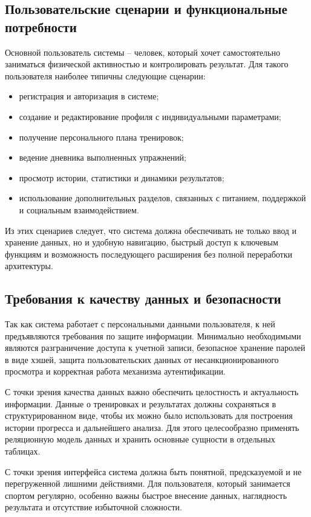 \subsection{Пользовательские сценарии и функциональные потребности}

Основной пользователь системы -- человек, который хочет самостоятельно заниматься физической активностью и контролировать результат. Для такого пользователя наиболее типичны следующие сценарии:
\begin{itemize}
	\item регистрация и авторизация в системе;
	\item создание и редактирование профиля с индивидуальными параметрами;
	\item получение персонального плана тренировок;
	\item ведение дневника выполненных упражнений;
	\item просмотр истории, статистики и динамики результатов;
	\item использование дополнительных разделов, связанных с питанием, поддержкой и социальным взаимодействием.
\end{itemize}

Из этих сценариев следует, что система должна обеспечивать не только ввод и хранение данных, но и удобную навигацию, быстрый доступ к ключевым функциям и возможность последующего расширения без полной переработки архитектуры.

\subsection{Требования к качеству данных и безопасности}

Так как система работает с персональными данными пользователя, к ней предъявляются требования по защите информации. Минимально необходимыми являются разграничение доступа к учетной записи, безопасное хранение паролей в виде хэшей, защита пользовательских данных от несанкционированного просмотра и корректная работа механизма аутентификации.

С точки зрения качества данных важно обеспечить целостность и актуальность информации. Данные о тренировках и результатах должны сохраняться в структурированном виде, чтобы их можно было использовать для построения истории прогресса и дальнейшего анализа. Для этого целесообразно применять реляционную модель данных и хранить основные сущности в отдельных таблицах.

С точки зрения интерфейса система должна быть понятной, предсказуемой и не перегруженной лишними действиями. Для пользователя, который занимается спортом регулярно, особенно важны быстрое внесение данных, наглядность результата и отсутствие избыточной сложности.

